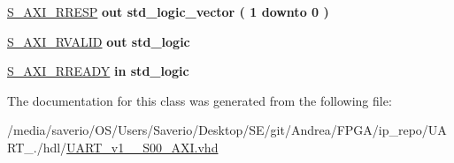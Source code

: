 \begin{DoxyCompactItemize}
\item 
\mbox{\label{classUART__v1__0__S00__AXI_a67ba85504b4c51fb0eb00d18fd70ad92}} 
\hyperlink{classUART__v1__0__S00__AXI_a67ba85504b4c51fb0eb00d18fd70ad92}{S\+\_\+\+A\+X\+I\+\_\+\+R\+R\+E\+SP}  {\bfseries {\bfseries \textcolor{vhdlchar}{out}\textcolor{vhdlchar}{ }}} {\bfseries \textcolor{vhdlchar}{std\+\_\+logic\+\_\+vector}\textcolor{vhdlchar}{ }\textcolor{vhdlchar}{(}\textcolor{vhdlchar}{ }\textcolor{vhdlchar}{ } \textcolor{vhdldigit}{1} \textcolor{vhdlchar}{ }\textcolor{vhdlchar}{downto}\textcolor{vhdlchar}{ }\textcolor{vhdlchar}{ } \textcolor{vhdldigit}{0} \textcolor{vhdlchar}{ }\textcolor{vhdlchar}{)}\textcolor{vhdlchar}{ }} 
\item 
\mbox{\label{classUART__v1__0__S00__AXI_a31f4e92d27c2c2005ee5f368a8249604}} 
\hyperlink{classUART__v1__0__S00__AXI_a31f4e92d27c2c2005ee5f368a8249604}{S\+\_\+\+A\+X\+I\+\_\+\+R\+V\+A\+L\+ID}  {\bfseries {\bfseries \textcolor{vhdlchar}{out}\textcolor{vhdlchar}{ }}} {\bfseries \textcolor{vhdlchar}{std\+\_\+logic}\textcolor{vhdlchar}{ }} 
\item 
\mbox{\label{classUART__v1__0__S00__AXI_a5850bf8f42acdf01938057507dc703b7}} 
\hyperlink{classUART__v1__0__S00__AXI_a5850bf8f42acdf01938057507dc703b7}{S\+\_\+\+A\+X\+I\+\_\+\+R\+R\+E\+A\+DY}  {\bfseries {\bfseries \textcolor{vhdlchar}{in}\textcolor{vhdlchar}{ }}} {\bfseries \textcolor{vhdlchar}{std\+\_\+logic}\textcolor{vhdlchar}{ }} 
\end{DoxyCompactItemize}


The documentation for this class was generated from the following file\+:\begin{DoxyCompactItemize}
\item 
/media/saverio/\+O\+S/\+Users/\+Saverio/\+Desktop/\+S\+E/git/\+Andrea/\+F\+P\+G\+A/ip\+\_\+repo/\+U\+A\+R\+T\+\_./hdl/\hyperlink{UART__v1__0__S00__AXI_8vhd}{U\+A\+R\+T\+\_\+v1\+\_\+\_\+\+S00\+\_\+\+A\+X\+I.\+vhd}\end{DoxyCompactItemize}
